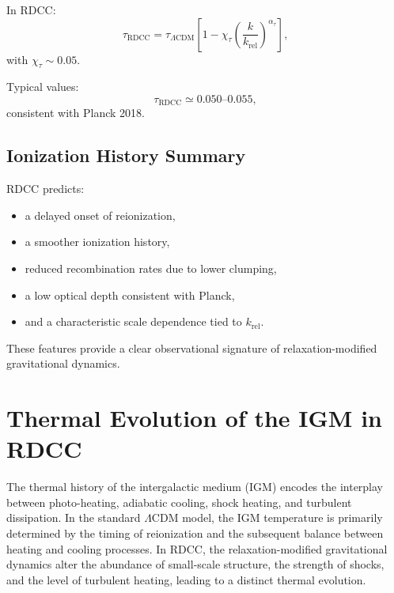 \documentclass[11pt,a4paper]{article}
\begin{document}
In RDCC:
\begin{equation}
\tau_{\mathrm{RDCC}}
=
\tau_{\Lambda\mathrm{CDM}}
\left[
1
-
\chi_{\tau}
\left(
\frac{k}{k_{\mathrm{rel}}}
\right)^{\alpha_{\tau}}
\right],
\end{equation}
with $\chi_{\tau} \sim 0.05$.

Typical values:
\begin{equation}
\tau_{\mathrm{RDCC}}
\simeq
0.050\text{--}0.055,
\end{equation}
consistent with Planck 2018.

\subsection{Ionization History Summary}

RDCC predicts:
\begin{itemize}
\item a delayed onset of reionization,
\item a smoother ionization history,
\item reduced recombination rates due to lower clumping,
\item a low optical depth consistent with Planck,
\item and a characteristic scale dependence tied to $k_{\mathrm{rel}}$.
\end{itemize}

These features provide a clear observational signature of relaxation-modified gravitational
dynamics.

\section{Thermal Evolution of the IGM in RDCC}

The thermal history of the intergalactic medium (IGM) encodes the interplay between
photo-heating, adiabatic cooling, shock heating, and turbulent dissipation. In the standard
$\Lambda$CDM model, the IGM temperature is primarily determined by the timing of
reionization and the subsequent balance between heating and cooling processes. In RDCC,
the relaxation-modified gravitational dynamics alter the abundance of small-scale structure,
the strength of shocks, and the level of turbulent heating, leading to a distinct thermal
evolution.
\end{document}
